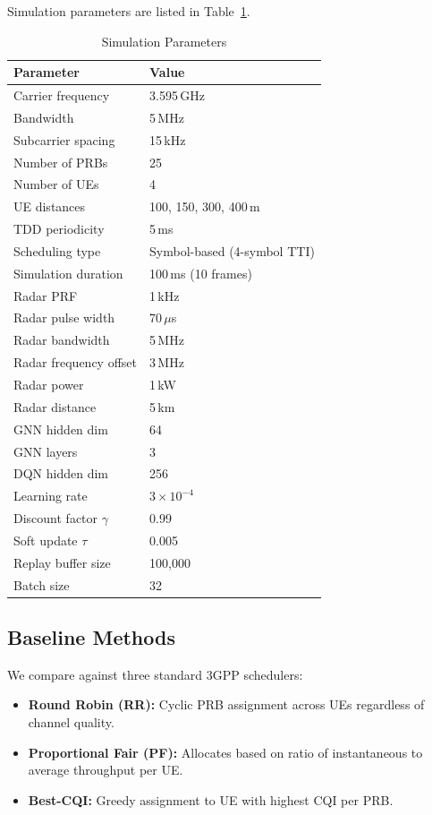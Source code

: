 \documentclass[conference]{IEEEtran}
\begin{document}
Simulation parameters are listed in Table~\ref{tab:params}.

\begin{table}[htbp]
\centering
\caption{Simulation Parameters}
\label{tab:params}
\begin{tabular}{ll}
\toprule
\textbf{Parameter} & \textbf{Value} \\
\midrule
Carrier frequency & 3.595\,GHz \\
Bandwidth & 5\,MHz \\
Subcarrier spacing & 15\,kHz \\
Number of PRBs & 25 \\
Number of UEs & 4 \\
UE distances & 100, 150, 300, 400\,m \\
TDD periodicity & 5\,ms \\
Scheduling type & Symbol-based (4-symbol TTI) \\
Simulation duration & 100\,ms (10 frames) \\
\midrule
Radar PRF & 1\,kHz \\
Radar pulse width & 70\,$\mu$s \\
Radar bandwidth & 5\,MHz \\
Radar frequency offset & 3\,MHz \\
Radar power & 1\,kW \\
Radar distance & 5\,km \\
\midrule
GNN hidden dim & 64 \\
GNN layers & 3 \\
DQN hidden dim & 256 \\
Learning rate & $3 \times 10^{-4}$ \\
Discount factor $\gamma$ & 0.99 \\
Soft update $\tau$ & 0.005 \\
Replay buffer size & 100,000 \\
Batch size & 32 \\
\bottomrule
\end{tabular}
\end{table}

\subsection{Baseline Methods}

We compare against three standard 3GPP schedulers:
\begin{itemize}
    \item \textbf{Round Robin (RR):} Cyclic PRB assignment across UEs regardless of channel quality.
    \item \textbf{Proportional Fair (PF):} Allocates based on ratio of instantaneous to average throughput per UE.
    \item \textbf{Best-CQI:} Greedy assignment to UE with highest CQI per PRB.
\end{itemize}
\end{document}
